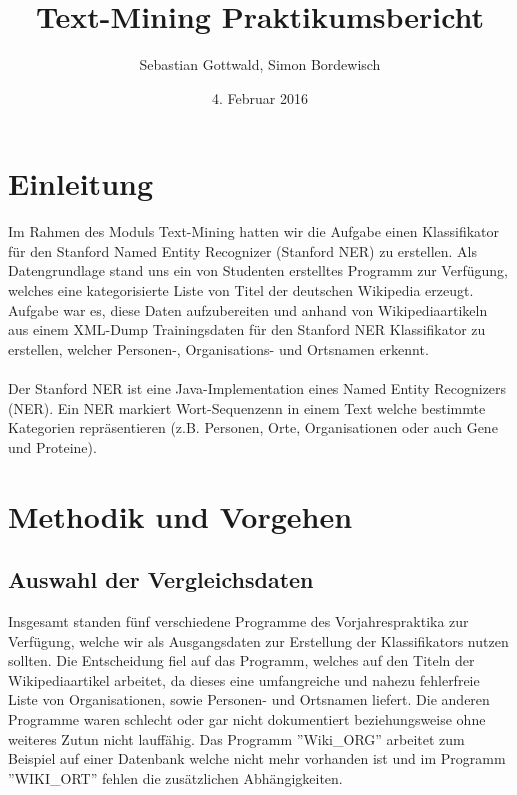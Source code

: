 \documentclass[a4paper]{article}
\author{Sebastian Gottwald, Simon Bordewisch}
\title{Text-Mining Praktikumsbericht}
\date{4. Februar 2016}
\begin{document}
\begin{titlepage}
\maketitle
\end{titlepage}

\section{Einleitung}
	Im Rahmen des Moduls Text-Mining hatten wir die Aufgabe einen Klassifikator für den Stanford Named Entity Recognizer (Stanford NER) zu erstellen. 
	Als Datengrundlage stand uns ein von Studenten erstelltes Programm zur Verfügung, welches eine kategorisierte Liste von Titel der deutschen Wikipedia erzeugt.
	Aufgabe war es, diese Daten aufzubereiten und anhand von Wikipediaartikeln aus einem XML-Dump Trainingsdaten für den Stanford NER Klassifikator zu erstellen, welcher Personen-, Organisations- und Ortsnamen erkennt.
	\\\\
	Der Stanford NER ist eine Java-Implementation eines Named Entity Recognizers (NER). 
	Ein NER markiert Wort-Sequenzenn in einem Text welche bestimmte Kategorien repräsentieren (z.B. Personen, Orte, Organisationen oder auch Gene und Proteine).
\section{Methodik und Vorgehen}
	\subsection{Auswahl der Vergleichsdaten}
		Insgesamt standen fünf verschiedene Programme des Vorjahrespraktika zur Verfügung, welche wir als Ausgangsdaten zur Erstellung der Klassifikators nutzen sollten.
		Die Entscheidung fiel auf das Programm, welches auf den Titeln der Wikipediaartikel arbeitet, da dieses eine umfangreiche und nahezu fehlerfreie Liste von Organisationen, sowie Personen- und Ortsnamen liefert.  
		Die anderen Programme waren schlecht oder gar nicht dokumentiert beziehungsweise ohne weiteres Zutun nicht lauffähig. 
		Das Programm ''Wiki\_ORG'' arbeitet zum Beispiel auf einer Datenbank welche nicht mehr vorhanden ist und im Programm ''WIKI\_ORT'' fehlen die zusätzlichen Abhängigkeiten.
		
\end{document}
